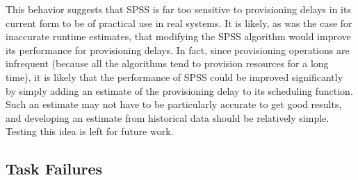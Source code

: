 \documentclass[conference]{IEEEtran}
\begin{document}


This behavior suggests that SPSS is far too sensitive to provisioning delays in its current form to be of practical use in real systems. It is likely, as was the case for inaccurate runtime estimates, that modifying the SPSS algorithm would improve its performance for provisioning delays. In fact, since provisioning operations are infrequent (because all the algorithms tend to provision resources for a long time), it is likely that the performance of SPSS could be improved significantly by simply adding an estimate of the provisioning delay to its scheduling function. Such an estimate may not have to be particularly accurate to get good results, and developing an estimate from historical data should be relatively simple. Testing this idea is left for future work.

\subsection{Task Failures}
\label{sec:failures}
\end{document}
